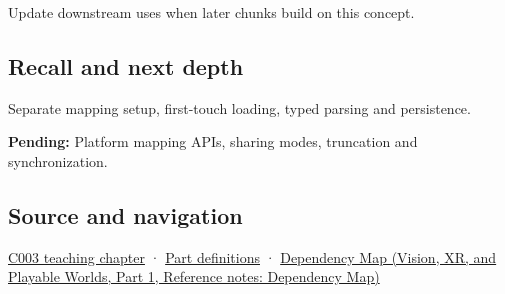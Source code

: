 \hypertarget{appendix-313ee7a0ba7b-used-by}{}

Update downstream uses when later chunks build on this concept.

\subsection{Recall and next depth}\label{appendix-313ee7a0ba7b-recall-and-next-depth}

\hypertarget{appendix-313ee7a0ba7b-recall-and-next-depth}{}

Separate mapping setup, first-touch loading, typed parsing and persistence.

\textbf{Pending:} Platform mapping APIs, sharing modes, truncation and synchronization.

\subsection{Source and navigation}\label{appendix-313ee7a0ba7b-source-and-navigation}

\hypertarget{appendix-313ee7a0ba7b-source-and-navigation}{}

\hyperref[01-foundations-i-ch002-where-the-bytes-live]{C003 teaching chapter} · \hyperref[appendix-fd090d982a15-m003---parts-41-60]{Part definitions} · \href{../07-Vision-XR-and-Playable-Worlds-P01/main.pdf\#appendix-4ad47bdd269a}{Dependency Map (Vision, XR, and Playable Worlds, Part 1, Reference notes: Dependency Map)}
